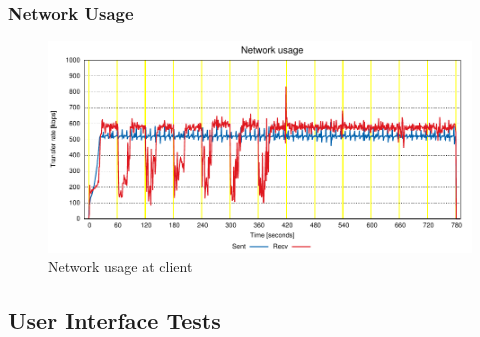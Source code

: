 \documentclass[compress]{beamer}
\begin{document}
	\begin{frame}[c]
		\frametitle{Network Usage}
		\begin{figure}[H]
			\includegraphics[width=\textwidth]{figures/net_clt.pdf}
			\caption{Network usage at client}
		\end{figure}
	\end{frame}

\subsection{User Interface Tests}
\end{document}
